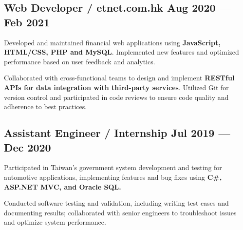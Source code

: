 \subsection{{Web Developer / etnet.com.hk \hfill Aug 2020 --- Feb 2021}}
\begin{zitemize}
        \item Developed and maintained financial web applications using \textbf{JavaScript, HTML/CSS, PHP and MySQL}. Implemented new features and optimized performance based on user feedback and analytics.
        \item Collaborated with cross-functional teams to design and implement \textbf{RESTful APIs for data integration with third-party services}. Utilized Git for version control and participated in code reviews to ensure code quality and adherence to best practices.
\end{zitemize}


\subsection{{Assistant Engineer / Internship \hfill Jul 2019 --- Dec 2020}}
\begin{zitemize}
    \item Participated in Taiwan's government system development and testing for automotive applications, implementing features and bug fixes using \textbf{C\#, ASP.NET MVC, and Oracle SQL.}
    \item Conducted software testing and validation, including writing test cases and documenting results; collaborated with senior engineers to troubleshoot issues and optimize system performance.
\end{zitemize}



